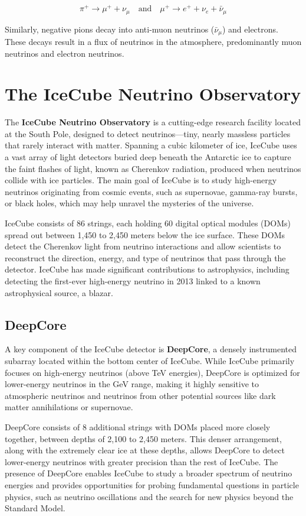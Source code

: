 \documentclass[a4paper,12pt,numbered]{article}
\begin{document}
\[
\pi^+ \rightarrow \mu^+ + \nu_\mu \quad \text{and} \quad \mu^+ \rightarrow e^+ + \nu_e + \bar{\nu}_\mu
\]

Similarly, negative pions decay into anti-muon neutrinos (\(\bar{\nu}_\mu\)) and electrons. These decays result in a flux of neutrinos in the atmosphere, predominantly muon neutrinos and electron neutrinos.

\section{The IceCube Neutrino Observatory}
The \textbf{IceCube Neutrino Observatory} is a cutting-edge research facility located at the South Pole, designed to detect neutrinos—tiny, nearly massless particles that rarely interact with matter. Spanning a cubic kilometer of ice, IceCube uses a vast array of light detectors buried deep beneath the Antarctic ice to capture the faint flashes of light, known as Cherenkov radiation, produced when neutrinos collide with ice particles. The main goal of IceCube is to study high-energy neutrinos originating from cosmic events, such as supernovae, gamma-ray bursts, or black holes, which may help unravel the mysteries of the universe.

IceCube consists of 86 strings, each holding 60 digital optical modules (DOMs) spread out between 1,450 to 2,450 meters below the ice surface. These DOMs detect the Cherenkov light from neutrino interactions and allow scientists to reconstruct the direction, energy, and type of neutrinos that pass through the detector. IceCube has made significant contributions to astrophysics, including detecting the first-ever high-energy neutrino in 2013 linked to a known astrophysical source, a blazar.

\subsection*{DeepCore}

A key component of the IceCube detector is \textbf{DeepCore}, a densely instrumented subarray located within the bottom center of IceCube. While IceCube primarily focuses on high-energy neutrinos (above TeV energies), DeepCore is optimized for lower-energy neutrinos in the GeV range, making it highly sensitive to atmospheric neutrinos and neutrinos from other potential sources like dark matter annihilations or supernovae.

DeepCore consists of 8 additional strings with DOMs placed more closely together, between depths of 2,100 to 2,450 meters. This denser arrangement, along with the extremely clear ice at these depths, allows DeepCore to detect lower-energy neutrinos with greater precision than the rest of IceCube. The presence of DeepCore enables IceCube to study a broader spectrum of neutrino energies and provides opportunities for probing fundamental questions in particle physics, such as neutrino oscillations and the search for new physics beyond the Standard Model.
\end{document}
